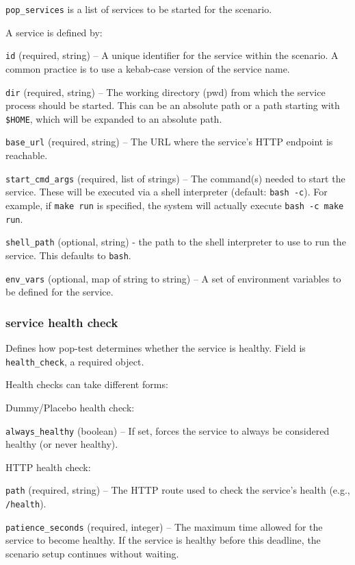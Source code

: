 \documentclass[11pt]{article}
\begin{document}
\texttt{pop\_services} is a list of services to be started for the scenario.

A service is defined by:  

\texttt{id} (required, string) – A unique identifier for the service within the scenario. A common practice is to use a kebab-case version of the service name.  

\texttt{dir} (required, string) – The working directory (pwd) from which the service process should be started. This can be an absolute path or a path starting with \texttt{\$HOME}, which will be expanded to an absolute path.  

\texttt{base\_url} (required, string) – The URL where the service’s HTTP endpoint is reachable.  

\texttt{start\_cmd\_args} (required, list of strings) – The command(s) needed to start the service. These will be executed via a shell interpreter (default: \texttt{bash -c}). For example, if \texttt{make run} is specified, the system will actually execute \texttt{bash -c make run}.

\texttt{shell\_path} (optional, string) - the path to the shell interpreter to use to run the service. This defaults to \texttt{bash}.  

\texttt{env\_vars} (optional, map of string to string) – A set of environment variables to be defined for the service.  

\subsubsection{service health check}
\label{sec:org3b20a95}

Defines how pop-test determines whether the service is healthy. Field is \texttt{health\_check}, a required object.

Health checks can take different forms:

Dummy/Placebo health check:

\texttt{always\_healthy} (boolean) – If set, forces the service to always be considered healthy (or never healthy).

HTTP health check:

\texttt{path} (required, string) – The HTTP route used to check the service’s health (e.g., \texttt{/health}).  

\texttt{patience\_seconds} (required, integer) – The maximum time allowed for the service to become healthy. If the service is healthy before this deadline, the scenario setup continues without waiting.
\end{document}

